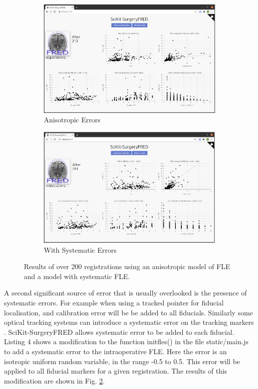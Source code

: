 \begin{figure}
	\begin{center}
		\begin{subfigure}[b]{0.48\linewidth}
			\includegraphics[width=\linewidth]{images/anisitropic_error.eps}
			\caption{\label{fig:anis_error}Anisotropic Errors}
		\end{subfigure}
		\begin{subfigure}[b]{0.48\linewidth}
			\includegraphics[width=\linewidth]{images/systematic_error.eps}
			\caption{\label{fig:sys_error}With Systematic Errors}
		\end{subfigure}
		\caption{\label{fig:other_errors}Results of over 200 registrations using an anisotropic model of {FLE} and a model with systematic {FLE}.}
	\end{center}
\end{figure}

A second significant source of error that is usually overlooked is the presence of systematic errors. For example when using a tracked pointer for fiducial localisation, and calibration error will be be added to all fiducials. Similarly some optical tracking systems can introduce a systematic error on the tracking markers \cite{6294449}. {SciKit-SurgeryFRED} allows systematic error to be added to each fiducial. Listing 4 shows 
a modification to the function init{\textunderscore}fles() in the file {static/main.js} to add a systematic error to the 
intraoperative {FLE}. Here the error is an isotropic uniform random variable, in the range -0.5 to 0.5. This error will be applied to all fiducial markers for a given registration. The results of this modification are shown in Fig. \ref{fig:sys_error}.

